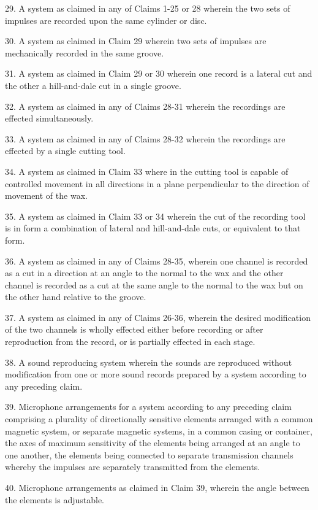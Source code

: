 \documentclass[11pt]{article}
\begin{document}
\begin{multicols*}{2}
29. A system as claimed in any of Claims 1-25 or 28 wherein the two sets of impulses are recorded upon the same cylinder or disc.

30. A system as claimed in Claim 29 wherein two sets of impulses are mechanically recorded in the same groove.

31. A system as claimed in Claim 29 or 30 wherein one record is a lateral cut and the other a hill-and-dale cut in a single groove.

32. A system as claimed in any of Claims 28-31 wherein the recordings are effected simultaneously.
 
33. A system as claimed in any of Claims 28-32 wherein the recordings are effected by a single cutting tool.

34. A system as claimed in Claim 33 where in the cutting tool is capable of controlled movement in all directions in a plane perpendicular to the direction of movement of the wax. 

35. A system as claimed in Claim 33 or 34 wherein the cut of the recording tool is in form a combination of lateral and hill-and-dale cuts, or equivalent to that form.

36. A system as claimed in any of Claims 28-35, wherein one channel is recorded as a cut in a direction at an angle to the normal to the wax and the other channel is recorded as a cut at the same angle to the normal to the wax but on the other hand relative to the groove.

37. A system as claimed in any of Claims 26-36, wherein the desired modification of the two channels is wholly effected either before recording or after reproduction from the record, or is partially effected in each stage. 

38. A sound reproducing system wherein the sounds are reproduced without modification from one or more sound records prepared by a system according to any preceding claim. 

39. Microphone arrangements for a system according to any preceding claim comprising a plurality of directionally sensitive elements arranged with a common magnetic system, or separate magnetic systems, in a common casing or container, the axes of maximum sensitivity of the elements being arranged at an angle to one another, the elements being connected to separate transmission channels whereby the impulses are separately transmitted from the elements.
 
40. Microphone arrangements as claimed in Claim 39, wherein the angle between the elements is adjustable.


\end{multicols*}
\end{document}
